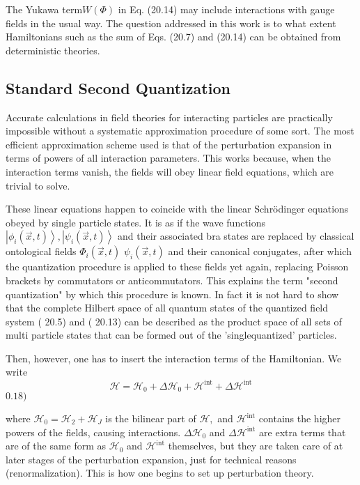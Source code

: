 \documentclass[main.tex]{subfiles}
\begin{document}
The Yukawa term$ W(\Phi)$ in Eq. (20.14) may include interactions with gauge fields in the usual way. The question addressed in this work is to what extent Hamiltonians such as the sum of Eqs. (20.7) and (20.14) can be obtained from deterministic theories.


\subsection{Standard Second Quantization}\label{ch20.3}

Accurate calculations in field theories for interacting particles are practically impossible without a systematic approximation procedure of some sort. The most efficient approximation scheme used is that of the perturbation expansion in terms of powers of all interaction parameters. This works because, when the interaction terms vanish, the fields will obey linear field equations, which are trivial to solve.

These linear equations happen to coincide with the linear Schrödinger equations obeyed by single particle states. It is as if the wave functions $\left|\phi_{i}(\vec{x}, t)\right\rangle,\left|\psi_{i}(\vec{x}, t)\right\rangle$ and their associated bra states are replaced by classical ontological fields $\Phi_{i}(\vec{x}, t)$ $\psi_{i}(\vec{x}, t)$ and their canonical conjugates, after which the quantization procedure is applied to these fields yet again, replacing Poisson brackets by commutators or anticommutators. This explains the term "second quantization" by which this procedure
is known. In fact it is not hard to show that the complete Hilbert space of all quantum states of the quantized field system ( 20.5) and ( 20.13) can be described as the product space of all sets of multi particle states that can be formed out of the 'singlequantized' particles.

Then, however, one has to insert the interaction terms of the Hamiltonian. We write
$$
\mathcal{H}=\mathcal{H}_{0}+\Delta \mathcal{H}_{0}+\mathcal{H}^{\mathrm{int}}+\Delta \mathcal{H}^{\mathrm{int}}
$$
$0.18)$

where $\mathcal{H}_{0}=\mathcal{H}_{2}+\mathcal{H}_{J}$ is the bilinear part of $\mathcal{H},$ and $\mathcal{H}^{\mathrm{int}}$ contains the higher powers of the fields, causing interactions. $\Delta \mathcal{H}_{0}$ and $\Delta \mathcal{H}^{\mathrm{int}}$ are extra terms that are of the same form as $\mathcal{H}_{0}$ and $\mathcal{H}^{\mathrm{int}}$ themselves, but they are taken care of at later stages of the perturbation expansion, just for technical reasons (renormalization). This is how one begins to set up perturbation theory.
\end{document}
